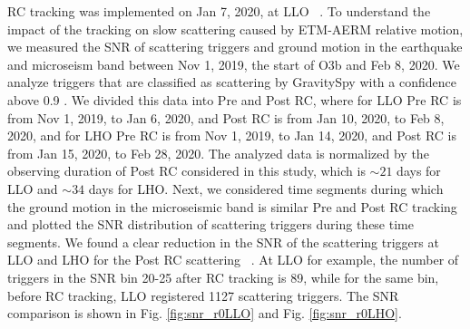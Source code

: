 \documentclass[12pt]{iopart}
\begin{document}
RC tracking was implemented on Jan 7, 2020, at LLO ~\cite{alog_anamaria}. To understand the impact of the tracking on slow scattering caused by ETM-AERM relative motion, we measured the SNR of scattering triggers and ground motion in the earthquake and microseism band between Nov 1, 2019, the start of O3b and Feb 8, 2020. We analyze triggers that are classified as scattering by GravitySpy with a confidence above 0.9 \cite{Zevin_2017}. We divided this data into Pre and Post RC, where for LLO Pre RC is from Nov 1, 2019, to Jan 6, 2020, and Post RC is from Jan 10, 2020, to Feb 8, 2020, and for LHO Pre RC is from Nov 1, 2019, to Jan 14, 2020, and Post RC is from Jan 15, 2020, to Feb 28, 2020. The analyzed data is normalized by the observing duration of Post RC considered in this study, which is $\sim 21$ days for LLO and $\sim 34$ days for LHO. Next, we considered time segments during which the ground motion in the microseismic band is similar Pre and Post RC tracking and plotted the SNR distribution of scattering triggers during these time segments. We found a clear reduction in the SNR of the scattering triggers at LLO and LHO for the Post RC scattering ~\cite{alogsid_R0}. At LLO for example, the number of triggers in the SNR bin 20-25 after RC tracking is 89, while for the same bin, before RC tracking, LLO registered 1127 scattering triggers. The SNR comparison is shown in Fig. \ref{fig:snr_r0LLO}  and Fig. \ref{fig:snr_r0LHO}.
\end{document}
